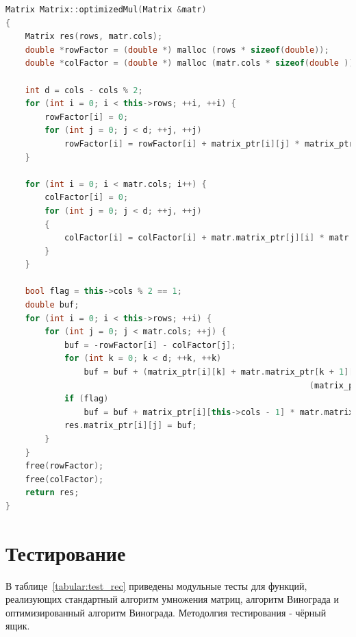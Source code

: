 \documentclass[12pt]{report}
\begin{document}
\begin{lstlisting}[label=vin_opt_code,caption=Функция оптимизированного алгоритма умножения матриц Винограда,language=C++]
Matrix Matrix::optimizedMul(Matrix &matr)
{
    Matrix res(rows, matr.cols);
    double *rowFactor = (double *) malloc (rows * sizeof(double));
    double *colFactor = (double *) malloc (matr.cols * sizeof(double ));

    int d = cols - cols % 2;
    for (int i = 0; i < this->rows; ++i, ++i) {
        rowFactor[i] = 0;
        for (int j = 0; j < d; ++j, ++j)
            rowFactor[i] = rowFactor[i] + matrix_ptr[i][j] * matrix_ptr[i][j + 1];
    }

    for (int i = 0; i < matr.cols; i++) {
        colFactor[i] = 0;
        for (int j = 0; j < d; ++j, ++j)
        {
            colFactor[i] = colFactor[i] + matr.matrix_ptr[j][i] * matr.matrix_ptr[j + 1][i];
        }
    }

    bool flag = this->cols % 2 == 1;
    double buf;
    for (int i = 0; i < this->rows; ++i) {
        for (int j = 0; j < matr.cols; ++j) {
            buf = -rowFactor[i] - colFactor[j];
            for (int k = 0; k < d; ++k, ++k)
                buf = buf + (matrix_ptr[i][k] + matr.matrix_ptr[k + 1][j]) *
                                                              (matrix_ptr[i][k + 1] + matr.matrix_ptr[k][j]);
            if (flag)
                buf = buf + matrix_ptr[i][this->cols - 1] * matr.matrix_ptr[this->cols - 1][j];
            res.matrix_ptr[i][j] = buf;
        }
    }
    free(rowFactor);
    free(colFactor);
    return res;
}
\end{lstlisting}

\newpage
\section{Тестирование}

В таблице~\ref{tabular:test_rec} приведены модульные тесты для функций, реализующих стандартный алгоритм умножения матриц, алгоритм Винограда и оптимизированный алгоритм Винограда. Методолгия тестирования - чёрный ящик.
\end{document}
